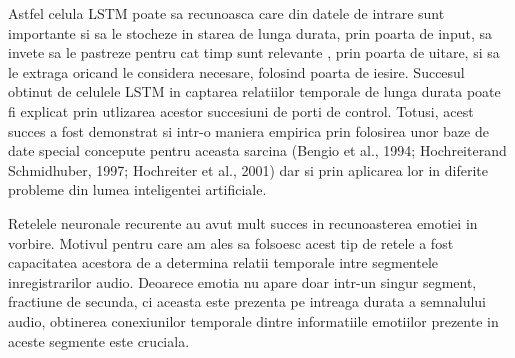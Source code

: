 \documentclass[a4paper,12pt]{book}
\begin{document}
				Astfel celula LSTM poate sa recunoasca care din datele de intrare sunt importante si sa le stocheze in starea de lunga durata, prin poarta de input, sa invete sa le pastreze pentru cat timp sunt relevante , prin poarta de uitare, si sa le extraga oricand le considera necesare, folosind poarta de iesire. Succesul obtinut de celulele LSTM in captarea relatiilor temporale de lunga durata poate fi explicat prin utlizarea acestor succesiuni de porti de control. Totusi, acest succes a fost demonstrat si intr-o maniera empirica prin folosirea unor baze de date special concepute pentru aceasta sarcina (Bengio et al., 1994; Hochreiterand Schmidhuber, 1997; Hochreiter et al., 2001) dar si prin aplicarea lor in diferite probleme din lumea inteligentei artificiale. \par
				
				Retelele neuronale recurente au avut mult succes in recunoasterea emotiei in vorbire. Motivul pentru care am ales sa folsoesc acest tip de retele a fost capacitatea acestora de a determina relatii temporale intre segmentele inregistrarilor audio. Deoarece emotia nu apare doar intr-un singur segment, fractiune de secunda, ci aceasta este prezenta pe intreaga durata a semnalului audio, obtinerea  conexiunilor temporale dintre informatiile emotiilor prezente in aceste segmente este cruciala. 
				
\end{document}
